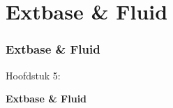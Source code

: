 %

\section{Extbase \& Fluid}
\begin{frame}[fragile]
	\frametitle{Extbase \& Fluid}

	\begin{center}\huge{Hoofdstuk 5:}\end{center}
	\begin{center}\huge{\color{typo3darkgrey}\textbf{Extbase \& Fluid}}\end{center}

\end{frame}



